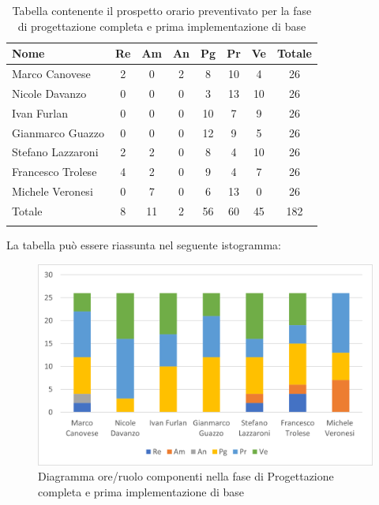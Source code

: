 \begin{longtable}{|l|c|c|c|c|c|c|c|}
	\hline
	\rowcolor{lighter-grayer}
	\textbf{Nome}     & \textbf{Re} & \textbf{Am} & \textbf{An} & \textbf{Pg} & \textbf{Pr} & \textbf{Ve} & \textbf{Totale} \\
	\hline
	\endfirsthead

	\hline
	Marco Canovese    & 2           & 0           & 2           & 8           & 10          & 4           & 26              \\
	\hline
	\hline
	Nicole Davanzo    & 0           & 0           & 0           & 3           & 13          & 10          & 26              \\
	\hline
	\hline
	Ivan Furlan       & 0           & 0           & 0           & 10          & 7           & 9           & 26              \\
	\hline
	\hline
	Gianmarco Guazzo  & 0           & 0           & 0           & 12          & 9           & 5           & 26              \\
	\hline
	\hline
	Stefano Lazzaroni & 2           & 2           & 0           & 8           & 4           & 10          & 26              \\
	\hline
	\hline
	Francesco Trolese & 4           & 2           & 0           & 9           & 4           & 7           & 26              \\
	\hline
	\hline
	Michele Veronesi  & 0           & 7           & 0           & 6           & 13          & 0           & 26              \\
	\hline
	\hline
	Totale            & 8           & 11          & 2           & 56          & 60          & 45          & 182             \\
	\hline
	\rowcolor{white}
	\caption{Tabella contenente il prospetto orario preventivato per la fase di progettazione completa e prima implementazione di base}
\end{longtable}


La tabella può essere riassunta nel seguente istogramma:

\begin{figure}[H]
	\centering
	\includegraphics[width=0.8\linewidth]{res/images/preventivo/5-1.png}
	\caption{Diagramma ore/ruolo componenti nella fase di Progettazione completa e prima implementazione di base}
	\label{fig:diagramma suddivisione ruoli fase progettazione completa e prima implementazione di base}
\end{figure}

